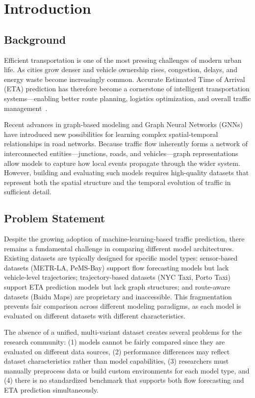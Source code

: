 \section{Introduction}

\subsection{Background}

Efficient transportation is one of the most pressing challenges of modern urban life. As cities grow denser and vehicle ownership rises, congestion, delays, and energy waste become increasingly common. Accurate Estimated Time of Arrival (ETA) prediction has therefore become a cornerstone of intelligent transportation systems—enabling better route planning, logistics optimization, and overall traffic management~\cite{deepTTE2018}.

Recent advances in graph-based modeling and Graph Neural Networks (GNNs)~\cite{kipf2017gcn} have introduced new possibilities for learning complex spatial-temporal relationships in road networks. Because traffic flow inherently forms a network of interconnected entities—junctions, roads, and vehicles—graph representations allow models to capture how local events propagate through the wider system. However, building and evaluating such models requires high-quality datasets that represent both the spatial structure and the temporal evolution of traffic in sufficient detail.

\subsection{Problem Statement}

Despite the growing adoption of machine-learning-based traffic prediction, there remains a fundamental challenge in comparing different model architectures. Existing datasets are typically designed for specific model types: sensor-based datasets (METR-LA, PeMS-Bay) support flow forecasting models but lack vehicle-level trajectories; trajectory-based datasets (NYC Taxi, Porto Taxi) support ETA prediction models but lack graph structures; and route-aware datasets (Baidu Maps) are proprietary and inaccessible. This fragmentation prevents fair comparison across different modeling paradigms, as each model is evaluated on different datasets with different characteristics.

The absence of a unified, multi-variant dataset creates several problems for the research community: (1) models cannot be fairly compared since they are evaluated on different data sources, (2) performance differences may reflect dataset characteristics rather than model capabilities, (3) researchers must manually preprocess data or build custom environments for each model type, and (4) there is no standardized benchmark that supports both flow forecasting and ETA prediction simultaneously.

